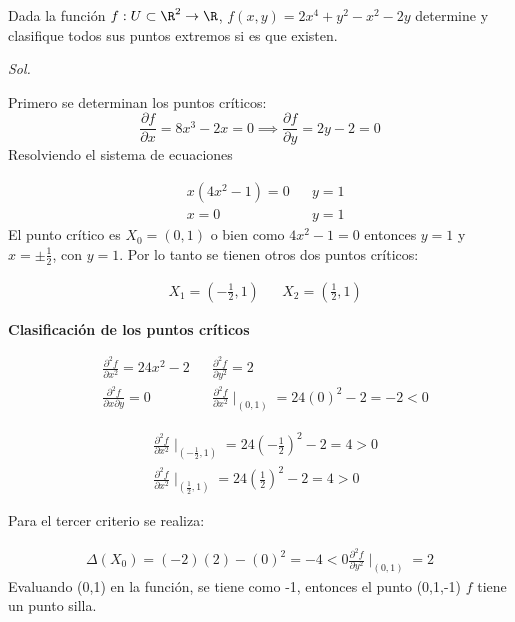 \begin{example}
	Dada la función $f:U\subset \R^2\to \R$, $f(x,y)=2x^4+y^2-x^2-2y$ determine
	y clasifique todos sus puntos extremos si es que existen.
\end{example}

\textit{ Sol. }

Primero se determinan los puntos críticos:
\begin{equation*}
	\frac{\partial f}{\partial x}=8x^3-2x=0\implies \frac{\partial f}{\partial y}=2y-2=0
\end{equation*}
Resolviendo el sistema de ecuaciones

\begin{align*}
	 & x\left(4x^2-1\right)=0 &  & y=1 \\
	 & x=0                    &  & y=1
\end{align*}
El punto crítico es $X_0=\left(0,1\right)$ o bien como $4x^2-1=0$
entonces $y=1$ y $x=\pm\frac{1}{2}$, con $y=1$. Por lo tanto se tienen otros dos puntos críticos:

\begin{align*}
	 & X_1=\left(-\frac{1}{2},1\right) &  & X_2=\left(\frac{1}{2},1\right)
\end{align*}

\textbf{Clasificación de los puntos críticos}

\begin{align*}
	 & \frac{\partial^2 f}{\partial x^2}=24x^2-2   &  & \frac{\partial^2 f}{\partial y^2}=2                          \\
	 & \frac{\partial^2 f}{\partial x\partial y}=0 &  & \frac{\partial^2 f}{\partial x^2}\mid_{(0,1)}=24(0)^2-2=-2<0
\end{align*}

\begin{align*}
	 & \frac{\partial^2 f}{\partial x^2}\mid_{\left(-\frac{1}{2},1\right)}=24\left(-\frac{1}{2}\right)^2-2=4>0 \\
	 & \frac{\partial^2 f}{\partial x^2}\mid_{\left(\frac{1}{2},1\right)}=24\left(\frac{1}{2}\right)^2-2=4>0
\end{align*}

Para el tercer criterio se realiza:

\begin{align*}
	\Delta (X_0)=(-2)(2)-(0)^2=-4<0
	\frac{\partial^2 f}{\partial y^2}\mid_{\left(0,1\right)}=2
\end{align*}
Evaluando (0,1) en la función, se tiene  como -1, entonces el punto (0,1,-1) $f$ tiene un punto silla.

